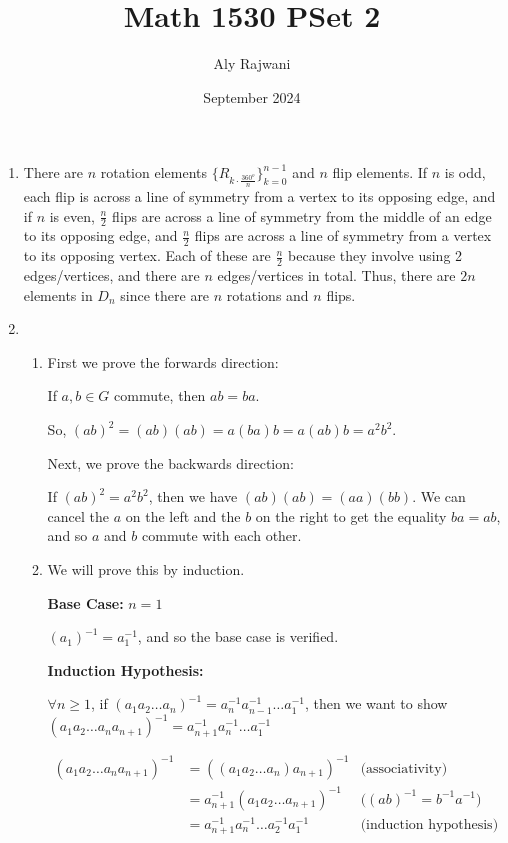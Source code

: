 \documentclass{article}
\title{Math 1530 PSet 2}
\author{Aly Rajwani}
\date{September 2024}
\begin{document}
\maketitle

\begin{enumerate}
    \item There are $n$ rotation elements $\{R_{k\cdot \frac{360^o}{n}}\}_{k=0}^{n-1}$ and $n$ flip elements. If $n$ is odd, each flip is across a line of symmetry from a vertex to its opposing edge, and if $n$ is even, $\frac{n}{2}$ flips are across a line of symmetry from the middle of an edge to its opposing edge, and $\frac{n}{2}$ flips are across a line of symmetry from a vertex to its opposing vertex. Each of these are $\frac{n}{2}$ because they involve using 2 edges/vertices, and there are $n$ edges/vertices in total. Thus, there are $2n$ elements in $D_n$ since there are $n$ rotations and $n$ flips. 

    \item 
        \begin{enumerate}
            \item First we prove the forwards direction: 

            If $a, b \in G$ commute, then $ab = ba$. 
            
            So, $(ab)^2 = (ab)(ab) = a(ba)b = a(ab)b = a^2b^2$.

            Next, we prove the backwards direction:

            If $(ab)^2 = a^2b^2$, then we have $(ab)(ab) = (aa)(bb)$. We can cancel the $a$ on the left and the $b$ on the right to get the equality $ba = ab$, and so $a$ and $b$ commute with each other. 

            \item We will prove this by induction. 

            \textbf{Base Case: } $n = 1$

            
            $(a_1)^{-1} = a_1^{-1}$, and so the base case is verified.

            \textbf{Induction Hypothesis:}

            $\forall n \geq 1$, if $(a_1a_2\dots a_n)^{-1} = a_n^{-1}a_{n-1}^{-1}\dots a_1^{-1}$, then we want to show $(a_1a_2\dots a_na_{n+1})^{-1} = a_{n+1}^{-1}a_n^{-1}\dots a_1^{-1}$

            \begin{align*}
                (a_1a_2\dots a_na_{n+1})^{-1} &= ((a_1a_2\dots a_n)a_{n+1})^{-1}  & \text{(associativity)} \\
                &= a_{n+1}^{-1}(a_1a_2\dots a_{n+1})^{-1} & \text{($(ab)^{-1} = b^{-1}a^{-1}$)}\\
                &= a_{n+1}^{-1}a_n^{-1}\dots a_2^{-1}a_1^{-1} & \text{(induction hypothesis)}
            \end{align*}


\end{enumerate}
\end{enumerate}
\end{document}
